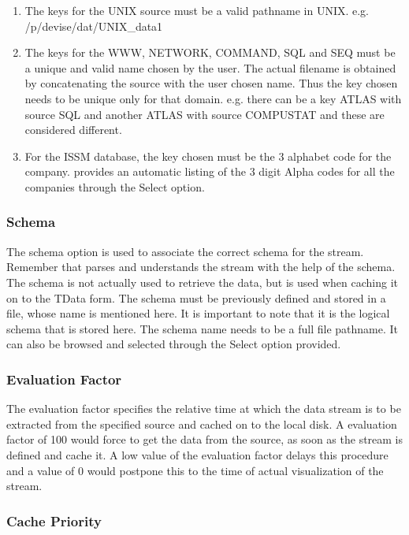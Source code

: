 \begin{enumerate}
\item
The keys for the UNIX source must be a valid pathname in UNIX.
e.g. /p/devise/dat/UNIX\_data1

\item
The keys for the WWW, NETWORK, COMMAND, SQL and SEQ must be a unique
and valid name chosen by the user. The actual filename is obtained by
concatenating the source with the user chosen name. Thus the key
chosen needs to be unique only for that domain. e.g. there can be a
key ATLAS with source SQL and another ATLAS with source COMPUSTAT and
these are considered different.

\item
For the ISSM database, the key chosen must be the 3 alphabet code for
the company. \Devise provides an automatic listing of the 3 digit Alpha
codes for all the companies through the Select option.
\end{enumerate}

\subsubsection{Schema}

The schema option is used to associate the correct schema for the
stream. Remember that \Devise parses and understands the stream with
the help of the schema. The schema is not actually used to retrieve
the data, but is used when caching it on to the TData form. The schema
must be previously defined and stored in a file, whose name is
mentioned here. It is important to note that it is the logical schema
that is stored here. The schema name needs to be a full file
pathname. It can also be browsed and selected through the Select
option provided.

\subsubsection{Evaluation Factor}

The evaluation factor specifies the relative time at which the data
stream is to be extracted from the specified source and cached on to
the local disk. A evaluation factor of 100 would force \Devise to get
the data from the source, as soon as the stream is defined and cache
it. A low value of the evaluation factor delays this procedure and a
value of 0 would postpone this to the time of actual visualization of
the stream.

\subsubsection{Cache Priority}

